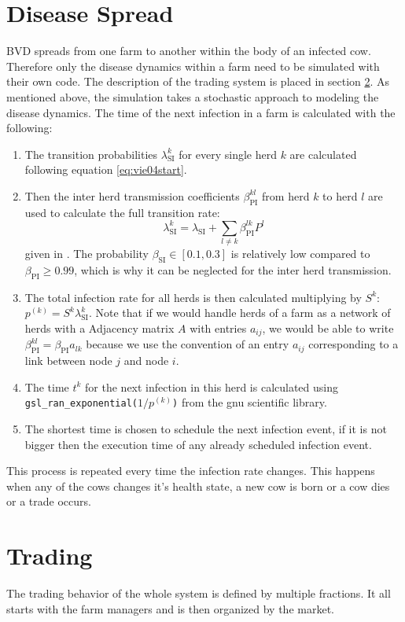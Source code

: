 \section{Disease Spread}
BVD spreads from one farm to another within the body of an infected cow. Therefore only the disease dynamics within a farm need to be simulated with their own code. The description of the trading system is placed in section \ref{chap:tradeDesc}. As mentioned above, the simulation takes a stochastic approach to modeling the disease dynamics. The time of the next infection in a farm is calculated with the following: \\
\begin{enumerate}
\item The transition probabilities $\lambda_\text{SI}^k$ for every single herd $k$ are calculated following equation \ref{eq:vie04start}.
\item Then the inter herd transmission coefficients $\beta^{kl}_\text{PI}$ from herd $k$ to herd $l$ are used to calculate the full transition rate:
\begin{equation}
\lambda_\text{SI}^k = \lambda_\text{SI} + \sum_{l \neq k} \beta^{lk}_\text{PI} P^l
\end{equation}
given in \citep{VIE04}. The probability $\beta_\text{SI} \in [0.1,0.3] $ is relatively low compared to $\beta_\text{PI} \geq 0.99$, which is why it can be neglected for the inter herd transmission.
\item The total infection rate for all herds is then calculated multiplying by $S^k$: $p^{(k)} = S^k \lambda_\text{SI}^k $. Note that if we would handle herds of a farm as a network of herds with a Adjacency matrix $A$ with entries $a_{ij}$, we would be able to write $\beta_\text{PI}^{kl}= \beta_\text{PI} a_{lk}$ because we use the convention of an entry $a_{ij}$ corresponding to a link between node $j$ and node $i$.
\item The time $t^k$ for the next infection in this herd is calculated using\\ {\tt gsl\_ran\_exponential($1/p^{(k)}$)} from the gnu scientific library.
\item The shortest time is chosen to schedule the next infection event, if it is not bigger then the execution time of any already scheduled infection event.
\end{enumerate}
This process is repeated every time the infection rate changes. This happens when any of the cows changes it's health state, a new cow is born or a cow dies or a trade occurs. 
\section{Trading}\label{chap:tradeDesc}
The trading behavior of the whole system is defined by multiple fractions. It all starts with the farm managers and is then organized by the market.
